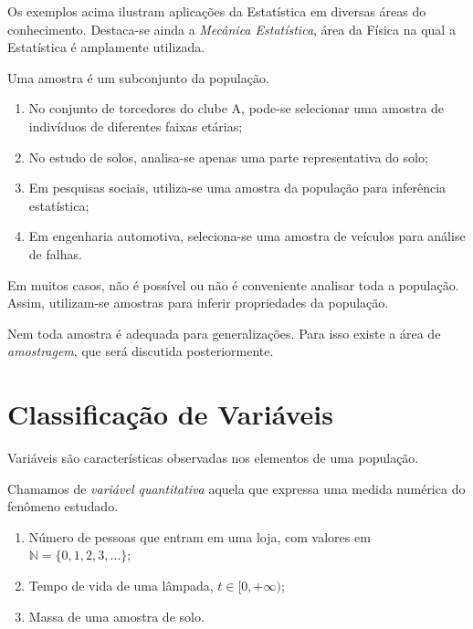 \inic Os exemplos acima ilustram aplicações da Estatística em diversas áreas do conhecimento. Destaca-se ainda a \textit{Mecânica Estatística}, área da Física na qual a Estatística é amplamente utilizada.

\begin{defin}[Amostra]
Uma amostra é um subconjunto da população.
\end{defin}

\noindent \exemplo
\begin{enumerate}
    \item[(i)] No conjunto de torcedores do clube A, pode-se selecionar uma amostra de indivíduos de diferentes faixas etárias;
    
    \item[(ii)] No estudo de solos, analisa-se apenas uma parte representativa do solo;
    
    \item[(iii)] Em pesquisas sociais, utiliza-se uma amostra da população para inferência estatística;
    
    \item[(iv)] Em engenharia automotiva, seleciona-se uma amostra de veículos para análise de falhas.
\end{enumerate}

\inic Em muitos casos, não é possível ou não é conveniente analisar toda a população. Assim, utilizam-se amostras para inferir propriedades da população.

\inic Nem toda amostra é adequada para generalizações. Para isso existe a área de \textit{amostragem}, que será discutida posteriormente.

\section{Classificação de Variáveis}

\inic Variáveis são características observadas nos elementos de uma população.

\inic Chamamos de \textit{variável quantitativa} aquela que expressa uma medida numérica do fenômeno estudado.

\noindent \exemplo
\begin{enumerate}
    \item[(i)] Número de pessoas que entram em uma loja, com valores em $\mathbb{N} = \{0,1,2,3,\ldots\}$;
    
    \item[(ii)] Tempo de vida de uma lâmpada, $t \in [0,+\infty)$;
    
    \item[(iii)] Massa de uma amostra de solo.
\end{enumerate}

